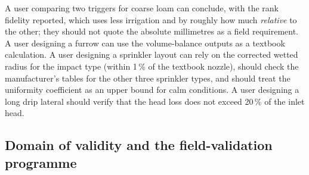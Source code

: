 \documentclass[preprint,12pt]{elsarticle}
\begin{document}
A user comparing two triggers for coarse loam can conclude, with the rank fidelity reported, which uses less irrigation and by roughly how much \emph{relative} to the other; they should not quote the absolute millimetres as a field requirement. A user designing a furrow can use the volume-balance outputs as a textbook calculation. A user designing a sprinkler layout can rely on the corrected wetted radius for the impact type (within 1\,\% of the textbook nozzle), should check the manufacturer's tables for the other three sprinkler types, and should treat the uniformity coefficient as an upper bound for calm conditions. A user designing a long drip lateral should verify that the head loss does not exceed 20\,\% of the inlet head.



\subsection{Domain of validity and the field-validation programme}
\label{sec:validity}
\end{document}
